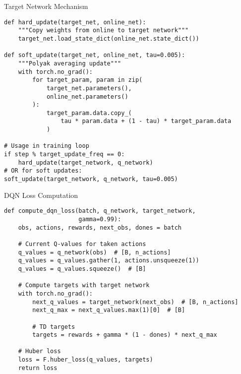 \documentclass[aspectratio=169,10pt]{beamer}
\begin{document}
\begin{frame}[fragile]{Target Network Mechanism}
\begin{lstlisting}
def hard_update(target_net, online_net):
    """Copy weights from online to target network"""
    target_net.load_state_dict(online_net.state_dict())

def soft_update(target_net, online_net, tau=0.005):
    """Polyak averaging update"""
    with torch.no_grad():
        for target_param, param in zip(
            target_net.parameters(), 
            online_net.parameters()
        ):
            target_param.data.copy_(
                tau * param.data + (1 - tau) * target_param.data
            )

# Usage in training loop
if step % target_update_freq == 0:
    hard_update(target_network, q_network)
# OR for soft updates:
soft_update(target_network, q_network, tau=0.005)
\end{lstlisting}
\end{frame}

\begin{frame}[fragile]{DQN Loss Computation}
\begin{lstlisting}
def compute_dqn_loss(batch, q_network, target_network, 
                     gamma=0.99):
    obs, actions, rewards, next_obs, dones = batch
    
    # Current Q-values for taken actions
    q_values = q_network(obs)  # [B, n_actions]
    q_values = q_values.gather(1, actions.unsqueeze(1))
    q_values = q_values.squeeze()  # [B]
    
    # Compute targets with target network
    with torch.no_grad():
        next_q_values = target_network(next_obs)  # [B, n_actions]
        next_q_max = next_q_values.max(1)[0]  # [B]
        
        # TD targets
        targets = rewards + gamma * (1 - dones) * next_q_max
    
    # Huber loss
    loss = F.huber_loss(q_values, targets)
    return loss
\end{lstlisting}
\end{frame}
\end{document}
